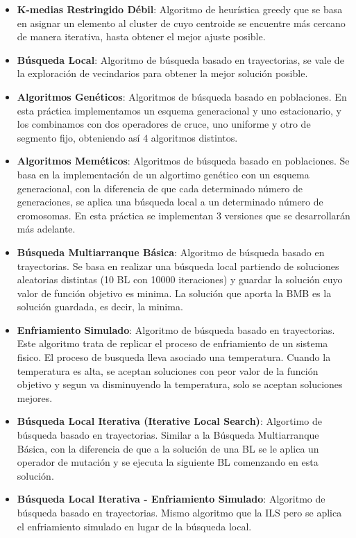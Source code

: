 \begin{itemize}
   \item \textbf{K-medias Restringido Débil}: Algoritmo de heurística greedy que se basa en asignar un elemento al cluster de cuyo centroide se encuentre más cercano de manera iterativa, hasta obtener el mejor ajuste posible.
   \item \textbf{Búsqueda Local}: Algoritmo de búsqueda basado en trayectorias, se vale de la exploración de vecindarios para obtener la mejor solución posible.
   \item \textbf{Algoritmos Genéticos}: Algoritmos de búsqueda basado en poblaciones. En esta práctica implementamos un esquema generacional y uno estacionario, y los combinamos con dos operadores de cruce, uno uniforme y otro de segmento fijo, obteniendo así 4 algoritmos distintos.
   \item \textbf{Algoritmos Meméticos}: Algoritmos de búsqueda basado en poblaciones. Se basa en la implementación de un algortimo genético con un esquema generacional, con la diferencia de que cada determinado número de generaciones, se aplica una búsqueda local a un determinado número de cromosomas. En esta práctica se implementan 3 versiones que se desarrollarán más adelante.
   \item \textbf{Búsqueda Multiarranque Básica}: Algoritmo de búsqueda basado en trayectorias. Se basa en realizar una búsqueda local partiendo de soluciones aleatorias distintas (10 BL con 10000 iteraciones) y guardar la solución cuyo valor de función objetivo es minima. La solución que aporta la BMB es la solución guardada, es decir, la minima.
   \item \textbf{Enfriamiento Simulado}: Algoritmo de búsqueda basado en trayectorias. Este algoritmo trata de replicar el proceso de enfriamiento de un sistema fisico. El proceso de busqueda lleva asociado una temperatura. Cuando la temperatura es alta, se aceptan soluciones con peor valor de la función objetivo y segun va disminuyendo la temperatura, solo se aceptan soluciones mejores.
   \item \textbf{Búsqueda Local Iterativa (Iterative Local Search)}: Algortimo de búsqueda basado en trayectorias. Similar a la Búsqueda Multiarranque Básica, con la diferencia de que a la solución de una BL se le aplica un operador de mutación y se ejecuta la siguiente BL comenzando en esta solución.
   \item \textbf{Búsqueda Local Iterativa - Enfriamiento Simulado}: Algoritmo de búsqueda basado en trayectorias. Mismo algoritmo que la ILS pero se aplica el enfriamiento simulado en lugar de la búsqueda local.

\end{itemize}

